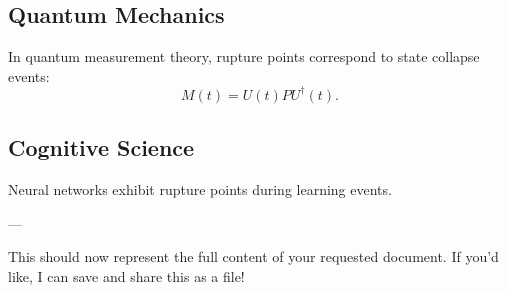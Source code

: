 \documentclass[12pt]{article}
\theoremstyle{plain}
\theoremstyle{definition}
\begin{document}
\subsection{Quantum Mechanics}
In quantum measurement theory, rupture points correspond to state collapse events:
\[
M(t) = U(t)PU^\dagger(t).
\]

\subsection{Cognitive Science}
Neural networks exhibit rupture points during learning events.

---

This should now represent the full content of your requested document. If you'd like, I can save and share this as a file!
\end{document}
